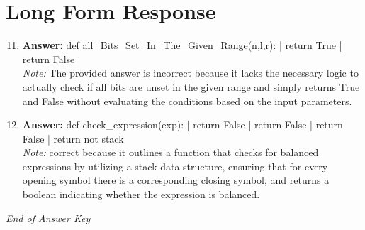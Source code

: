 \documentclass[12pt]{article}
\begin{document}
\section*{Long Form Response}
\begin{enumerate}[label=\arabic*.]
\setcounter{enumi}{10}
\item \textbf{Answer:} def all\_Bits\_Set\_In\_The\_Given\_Range(n,l,r): | return True | return False
\\ \textit{Note:} The provided answer is incorrect because it lacks the necessary logic to actually check if all bits are unset in the given range and simply returns True and False without evaluating the conditions based on the input parameters.
\item \textbf{Answer:} def check\_expression(exp): | return False | return False | return False | return not stack
\\ \textit{Note:} correct because it outlines a function that checks for balanced expressions by utilizing a stack data structure, ensuring that for every opening symbol there is a corresponding closing symbol, and returns a boolean indicating whether the expression is balanced.
\end{enumerate}

\vfill
\noindent\textit{End of Answer Key}
\end{document}

